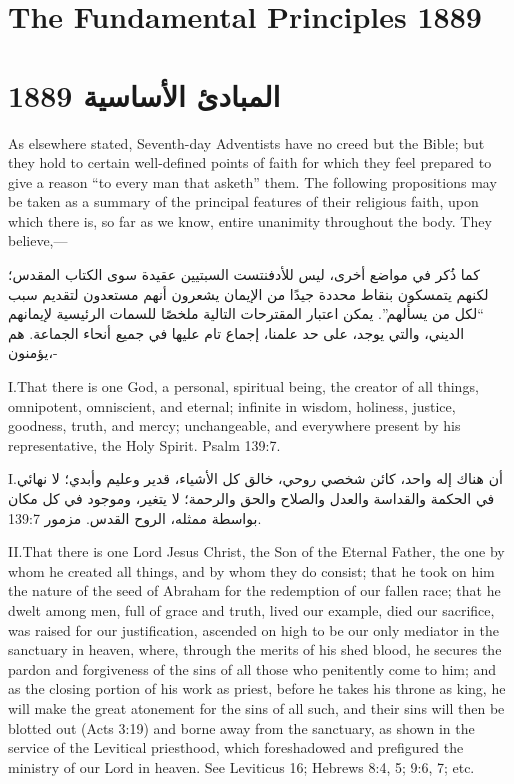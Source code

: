  \label{chap:appendix}


 \label{chap:appendix}






\section*{The Fundamental Principles 1889}


\section*{المبادئ الأساسية 1889}


As elsewhere stated, Seventh-day Adventists have no creed but the Bible; but they hold to certain well-defined points of faith for which they feel prepared to give a reason “to every man that asketh” them. The following propositions may be taken as a summary of the principal features of their religious faith, upon which there is, so far as we know, entire unanimity throughout the body. They believe,—


كما ذُكر في مواضع أخرى، ليس للأدفنتست السبتيين عقيدة سوى الكتاب المقدس؛ لكنهم يتمسكون بنقاط محددة جيدًا من الإيمان يشعرون أنهم مستعدون لتقديم سبب “لكل من يسألهم”. يمكن اعتبار المقترحات التالية ملخصًا للسمات الرئيسية لإيمانهم الديني، والتي يوجد، على حد علمنا، إجماع تام عليها في جميع أنحاء الجماعة. هم يؤمنون،-


\lettrine{I.} That there is one God, a personal, spiritual being, the creator of all things, omnipotent, omniscient, and eternal; infinite in wisdom, holiness, justice, goodness, truth, and mercy; unchangeable, and everywhere present by his representative, the Holy Spirit. Psalm 139:7.


\lettrine{I.} أن هناك إله واحد، كائن شخصي روحي، خالق كل الأشياء، قدير وعليم وأبدي؛ لا نهائي في الحكمة والقداسة والعدل والصلاح والحق والرحمة؛ لا يتغير، وموجود في كل مكان بواسطة ممثله، الروح القدس. مزمور 139:7.


\lettrine{II.} That there is one Lord Jesus Christ, the Son of the Eternal Father, the one by whom he created all things, and by whom they do consist; that he took on him the nature of the seed of Abraham for the redemption of our fallen race; that he dwelt among men, full of grace and truth, lived our example, died our sacrifice, was raised for our justification, ascended on high to be our only mediator in the sanctuary in heaven, where, through the merits of his shed blood, he secures the pardon and forgiveness of the sins of all those who penitently come to him; and as the closing portion of his work as priest, before he takes his throne as king, he will make the great atonement for the sins of all such, and their sins will then be blotted out (Acts 3:19) and borne away from the sanctuary, as shown in the service of the Levitical priesthood, which foreshadowed and prefigured the ministry of our Lord in heaven. See Leviticus 16; Hebrews 8:4, 5; 9:6, 7; etc.


